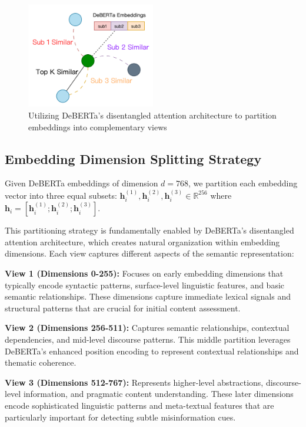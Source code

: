 \begin{figure}[h]
    \centering
    \includegraphics[width=0.5\textwidth]{context/methodology/fig/multi_view.png}
    \caption{Utilizing DeBERTa's disentangled attention architecture to partition embeddings into complementary views}
    \label{fig:multi_view}
\end{figure}

\subsection{Embedding Dimension Splitting Strategy}

Given DeBERTa embeddings of dimension $d = 768$, we partition each embedding vector into three equal subsets: $\mathbf{h}_i^{(1)}, \mathbf{h}_i^{(2)}, \mathbf{h}_i^{(3)} \in \mathbb{R}^{256}$ where $\mathbf{h}_i = [\mathbf{h}_i^{(1)}; \mathbf{h}_i^{(2)}; \mathbf{h}_i^{(3)}]$.

This partitioning strategy is fundamentally enabled by DeBERTa's disentangled attention architecture, which creates natural organization within embedding dimensions. Each view captures different aspects of the semantic representation:

\textbf{View 1 (Dimensions 0-255):} Focuses on early embedding dimensions that typically encode syntactic patterns, surface-level linguistic features, and basic semantic relationships. These dimensions capture immediate lexical signals and structural patterns that are crucial for initial content assessment.

\textbf{View 2 (Dimensions 256-511):} Captures semantic relationships, contextual dependencies, and mid-level discourse patterns. This middle partition leverages DeBERTa's enhanced position encoding to represent contextual relationships and thematic coherence.

\textbf{View 3 (Dimensions 512-767):} Represents higher-level abstractions, discourse-level information, and pragmatic content understanding. These later dimensions encode sophisticated linguistic patterns and meta-textual features that are particularly important for detecting subtle misinformation cues.


